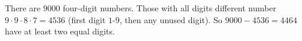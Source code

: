 There are $9000$ four-digit numbers. Those with all digits different number $9\cdot9\cdot8\cdot7=4536$ (first digit $1$-$9$, then any unused digit). So $9000-4536=\boxed{4464}$ have at least two equal digits.

